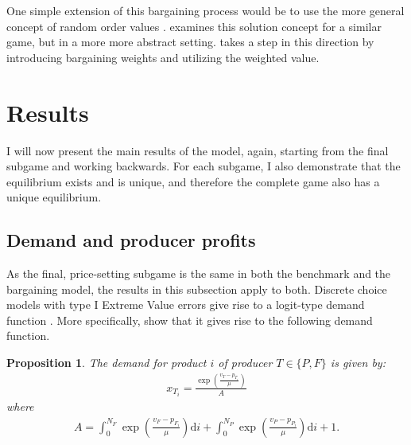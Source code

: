 \documentclass[a4paper]{article}
\newtheorem{proposition}{Proposition}
\newcommand{\di}{\mathrm{d}i}
\begin{document}
One simple extension of this bargaining process would be to use the more general concept of random order values \parencite{weber1988probabilistic}.
\textcite{stancsics2023bargaining} examines this solution concept for a similar game, but in a more more abstract setting.
 takes a step in this direction by introducing bargaining weights and utilizing the weighted value.

\section{Results}
\label{sec:results}

I will now present the main results of the model, again, starting from the final subgame and working backwards.
For each subgame, I also demonstrate that the equilibrium exists and is unique, and therefore the complete game also has a unique equilibrium.

\subsection{Demand and producer profits}
\label{sec:results_demand}

As the final, price-setting subgame is the same in both the benchmark and the bargaining model, the results in this subsection apply to both.
Discrete choice models with type I Extreme Value errors give rise to a logit-type demand function \parencite[e.g.][]{small1981applied}.
More specifically, \textcite[]{anderson2021hybrid} show that it gives rise to the following demand function.
\begin{proposition}
    \label{prop:demand_function}
    The demand for product $i$ of producer $T \in \{P, F\}$ is given by:
    \begin{align*}
        x_{T_i} = \frac{\exp\left( \frac{v_T - p_{T_i}}{\mu} \right)}{A}
    \end{align*}
    where
    \begin{align}
        A = \int_0^{N_F} \exp\left( \frac{v_F - p_{F_i}}{\mu} \right) \di + \int_0^{N_P} \exp\left( \frac{v_P - p_{P_i}}{\mu} \right) \di + 1.
        \label{eq:aggregate}
    \end{align}
\end{proposition}
\end{document}
